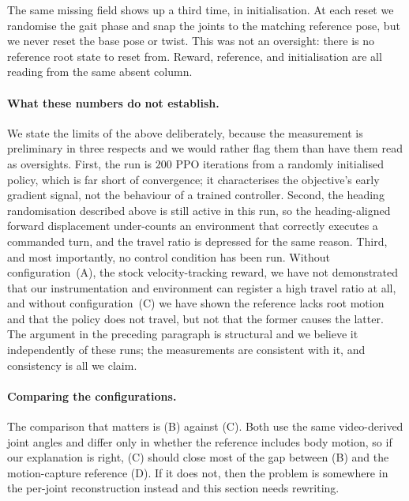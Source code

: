 \documentclass{article}
\theoremstyle{plain}
\theoremstyle{definition}
\theoremstyle{remark}
\begin{document}
The same missing field shows up a third time, in initialisation. At each reset
we randomise the gait phase and snap the joints to the matching reference
pose, but we never reset the base pose or twist. This was not an oversight:
there is no reference root state to reset from. Reward, reference, and
initialisation are all reading from the same absent column.

\paragraph{What these numbers do not establish.} We state the limits of the
above deliberately, because the measurement is preliminary in three respects
and we would rather flag them than have them read as oversights. First, the
run is $200$ PPO iterations from a randomly initialised policy, which is far
short of convergence; it characterises the objective's early gradient signal,
not the behaviour of a trained controller. Second, the heading randomisation
described above is still active in this run, so the heading-aligned forward
displacement under-counts an environment that correctly executes a commanded
turn, and the travel ratio is depressed for the same reason. Third, and most
importantly, no control condition has been run. Without configuration~(A),
the stock velocity-tracking reward, we have not demonstrated that our
instrumentation and environment can register a high travel ratio at all, and
without configuration~(C) we have shown the reference lacks root motion and
that the policy does not travel, but not that the former causes the latter.
The argument in the preceding paragraph is structural and we believe it
independently of these runs; the measurements are consistent with it, and
consistency is all we claim.

\paragraph{Comparing the configurations.}  The comparison that matters is (B) against (C). Both use the same
video-derived joint angles and differ only in whether the reference includes
body motion, so if our explanation is right, (C) should close most of the gap
between (B) and the motion-capture reference (D). If it does not, then the
problem is somewhere in the per-joint reconstruction instead and this section
needs rewriting.
 
\end{document}
